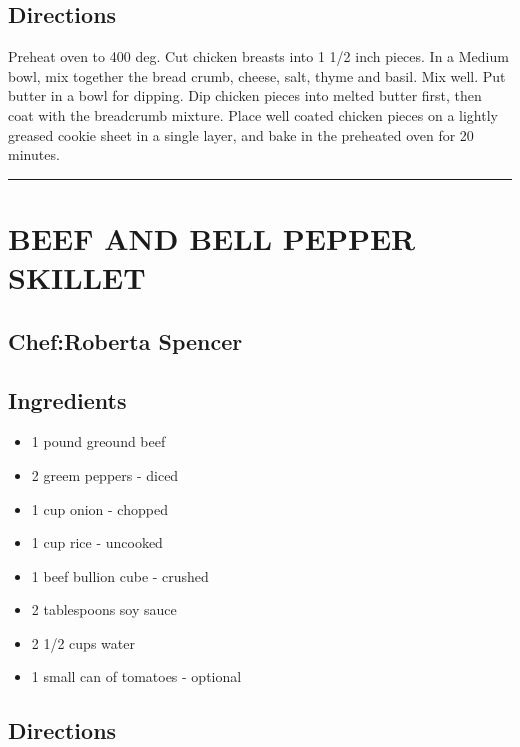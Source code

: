 \documentclass[
]{book}
\providecommand{\tightlist}{%
  \setlength{\itemsep}{0pt}\setlength{\parskip}{0pt}}
\begin{document}
\hypertarget{directions-42}{%
\subsection*{Directions}\label{directions-42}}


Preheat oven to 400 deg. Cut chicken breasts into 1 1/2 inch pieces. In a
Medium bowl, mix together the bread crumb, cheese, salt, thyme and basil.
Mix well. Put butter in a bowl for dipping. Dip chicken pieces into melted
butter first, then coat with the breadcrumb mixture. Place well coated chicken
pieces on a lightly greased cookie sheet in a single layer, and bake in
the preheated oven for 20 minutes.

\begin{center}\rule{0.5\linewidth}{0.5pt}\end{center}

\hypertarget{beef-and-bell-pepper-skillet}{%
\section*{BEEF AND BELL PEPPER SKILLET}\label{beef-and-bell-pepper-skillet}}


\hypertarget{chefroberta-spencer}{%
\subsection*{Chef:Roberta Spencer}\label{chefroberta-spencer}}


\hypertarget{ingredients-43}{%
\subsection*{Ingredients}\label{ingredients-43}}


\begin{itemize}
\tightlist
\item
  1 pound greound beef
\item
  2 greem peppers - diced
\item
  1 cup onion - chopped
\item
  1 cup rice - uncooked
\item
  1 beef bullion cube - crushed
\item
  2 tablespoons soy sauce
\item
  2 1/2 cups water
\item
  1 small can of tomatoes - optional
\end{itemize}

\hypertarget{directions-43}{%
\subsection*{Directions}\label{directions-43}}
\end{document}

